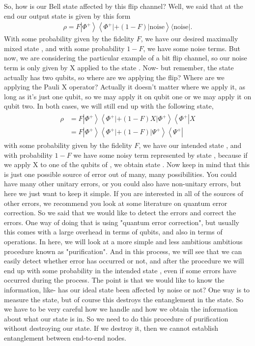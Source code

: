 So, how is our Bell state affected by this flip channel? Well, we said that at the end our output state is given by this form
\begin{align}
    \rho=F\left|\Phi^{+}\right\rangle\left\langle\Phi^{+}|+(1-F)| \text {noise}\right\rangle\langle\text{noise}|.
\end{align}
With some probability given by the fidelity $F$, we have our desired maximally mixed state  \ket{\Phi^+}, and with some probability $1-F$, we have some noise terms. But now, we are considering the particular example of a bit flip channel, so our noise term is only given by X applied to the state  \ket{\Phi^+}. Now- but remember, the state  \ket{\Phi^+} actually has two qubits, so where are we applying the flip? Where are we applying the Pauli X operator? Actually it doesn't matter where we apply it, as long as it's just one qubit, so we may apply it on qubit one or we may apply it on qubit two. In both cases, we will still end up with the following state,
\begin{align}
\begin{aligned}
\rho &=F\left|\Phi^{+}\right\rangle\left\langle\Phi^{+}|+(1-F) X| \Phi^{+}\right\rangle\left\langle\Phi^{+}\right| X \\
&=F\left|\Phi^{+}\right\rangle\left\langle\Phi^{+}|+(1-F)| \Psi^{+}\right\rangle\left\langle\Psi^{+}\right|
\end{aligned}
\end{align}
with some probability given by the fidelity $F$, we have our intended state  \ket{\Phi^+}, and with probability $1-F$ we have some noisy term represented by state \ket{\Psi^+}, because if we apply X to one of the qubits of  \ket{\Phi^+}, we obtain state \ket{\Psi^+}. Now keep in mind that this is just one possible source of error out of many, many possibilities. You could have many other unitary errors, or you could also have non-unitary errors, but here we just want to keep it simple. If you are interested in all of the sources of other errors, we recommend you look at some literature on quantum error correction. So we said that we would like to detect the errors and correct the errors. One way of doing that is using "quantum error correction", but usually this comes with a large overhead in terms of qubits, and also in terms of operations. In here, we will look at a more simple and less ambitious ambitious procedure known as "purification". And in this process, we will see that we can easily detect whether error has occurred or not, and after the procedure we will end up with some probability in the intended state  \ket{\Phi^+}, even if some errors have occurred during the process. The point is that we would like to know the information, like- has our ideal state been affected by noise or not? One way is to measure the state, but of course this destroys the entanglement in the state. So we have to be very careful how we handle and how we obtain the information about what our state is in. So we need to do this procedure of purification without destroying our state. If we destroy it, then we cannot establish entanglement between end-to-end nodes.

